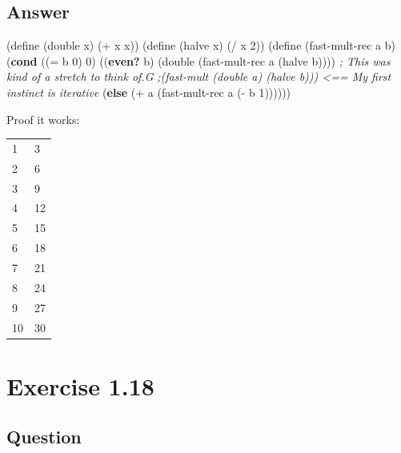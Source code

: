 \documentclass[
]{article}
\newenvironment{Shaded}{}{}
\newcommand{\CommentTok}[1]{\textcolor[rgb]{0.38,0.63,0.69}{\textit{#1}}}
\newcommand{\DecValTok}[1]{\textcolor[rgb]{0.25,0.63,0.44}{#1}}
\newcommand{\ExtensionTok}[1]{#1}
\newcommand{\FunctionTok}[1]{\textcolor[rgb]{0.02,0.16,0.49}{#1}}
\newcommand{\KeywordTok}[1]{\textcolor[rgb]{0.00,0.44,0.13}{\textbf{#1}}}
\newcommand{\NormalTok}[1]{#1}
\newcommand{\OperatorTok}[1]{\textcolor[rgb]{0.40,0.40,0.40}{#1}}
\begin{document}
\hypertarget{answer-15}{%
\subsection{Answer}\label{answer-15}}

\hypertarget{fast-mult}{%
\label{fast-mult}}%
\begin{Shaded}
\begin{Highlighting}[numbers=left,,]
\NormalTok{(}\ExtensionTok{define}\FunctionTok{ }\NormalTok{(double x)}
\NormalTok{  (}\OperatorTok{+}\NormalTok{ x x))}
\NormalTok{(}\ExtensionTok{define}\FunctionTok{ }\NormalTok{(halve x)}
\NormalTok{  (}\OperatorTok{/}\NormalTok{ x }\DecValTok{2}\NormalTok{))}
\NormalTok{(}\ExtensionTok{define}\FunctionTok{ }\NormalTok{(fast{-}mult{-}rec a b)}
\NormalTok{  (}\KeywordTok{cond}\NormalTok{ ((}\OperatorTok{=}\NormalTok{ b }\DecValTok{0}\NormalTok{) }\DecValTok{0}\NormalTok{)}
\NormalTok{        ((}\KeywordTok{even?}\NormalTok{ b)}
\NormalTok{         (double (fast{-}mult{-}rec a (halve b)))) }\CommentTok{; This was kind of a stretch to think of.G}
         \CommentTok{;(fast{-}mult (double a) (halve b))) \textless{}== My first instinct is iterative}
\NormalTok{        (}\KeywordTok{else}\NormalTok{ (}\OperatorTok{+}\NormalTok{ a (fast{-}mult{-}rec a (}\OperatorTok{{-}}\NormalTok{ b }\DecValTok{1}\NormalTok{))))))}
\end{Highlighting}
\end{Shaded}

Proof it works:

\begin{longtable}[]{@{}ll@{}}
\toprule
\endhead
1 & 3 \\
2 & 6 \\
3 & 9 \\
4 & 12 \\
5 & 15 \\
6 & 18 \\
7 & 21 \\
8 & 24 \\
9 & 27 \\
10 & 30 \\
\bottomrule
\end{longtable}

\hypertarget{exercise-1.18}{%
\section{Exercise 1.18}\label{exercise-1.18}}

\hypertarget{question-16}{%
\subsection{Question}\label{question-16}}
\end{document}
